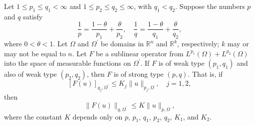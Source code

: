 \begin{theorem}
  Let $1 \leq p_1 \leq q_1<\infty$ and $1 \leq p_2 \leq q_2 \leq \infty$, with $q_1<q_2$.
  Suppose the numbers $p$ and $q$ satisfy
  \[ \frac{1}{p}=\frac{1-\theta}{p_1}+\frac{\theta}{p_2}, \quad
    \frac{1}{q}=\frac{1-\theta}{q_1}+\frac{\theta}{q_2}, \]
  where $0<\theta<1$. Let $\Omega$ and $\Omega^{\prime}$
  be domains in $\mathbb{R}^n$ and $\mathbb{R}^k$, 
  respectively; $k$ may or may not be equal to $n$.
  Let $F$ be a sublinear operator from $L^{p_1}(\Omega)+L^{p_2}(\Omega)$
  into the space of measurable functions on $\Omega^{\prime}$.
  If $F$ is of weak type $\left(p_1, q_1\right)$ and also of weak type $\left(p_2, q_2\right)$,
  then $F$ is of strong type $(p, q)$. That is, if
  \[ [F(u)]_{q_j, \Omega^{\prime}} \leq K_j\|u\|_{p_j, \Omega}, \quad j=1,2, \]
  then
  \[ \|F(u)\|_{q, \Omega^{\prime}} \leq K\|u\|_{p, \Omega}, \]
  where the constant $K$ depends only on $p$, $p_1$, $q_1$, $p_2$, $q_2$, $K_1$, and $K_2$.
\end{theorem}

